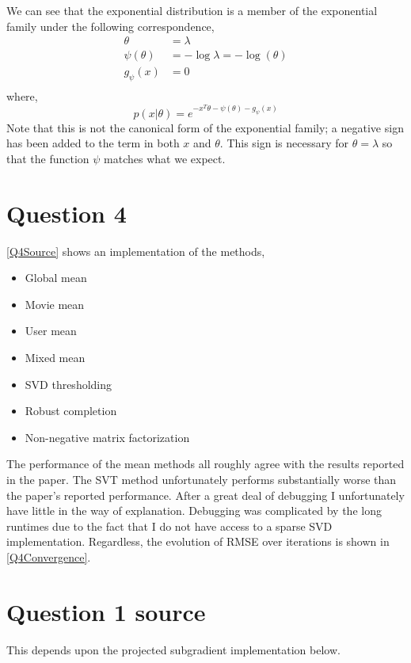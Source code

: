 \documentclass{article}
\begin{document}
\begin{enumerate}
  We can see that the exponential distribution is a member of the
  exponential family under the following correspondence,
  \begin{align*}
    \theta & = \lambda \\
    \psi(\theta) & = -\log \lambda = -\log(\theta) \\
    g_\psi(x) & = 0 \\
  \end{align*}
  where,
  \[ p(x \vert \theta) = e^{-x^T \theta - \psi(\theta) - g_\psi(x)} \]
  Note that this is not the canonical form of the exponential family;
a negative sign has been added to the term in both $x$ and
$\theta$. This sign is necessary for $\theta = \lambda$ so that the
function $\psi$ matches what we expect.
\end{enumerate}

\section{Question 4}

\ref{Q4Source} shows an implementation of the methods,

\begin{itemize}
\item Global mean
\item Movie mean
\item User mean
\item Mixed mean
\item SVD thresholding
\item Robust completion
\item Non-negative matrix factorization
\end{itemize}

The performance of the mean methods all roughly agree with the results
reported in the paper. The SVT method unfortunately performs
substantially worse than the paper's reported performance. After a
great deal of debugging I unfortunately have little in the way of
explanation. Debugging was complicated by the long runtimes due to the
fact that I do not have access to a sparse SVD
implementation. Regardless, the evolution of RMSE over iterations is
shown in \ref{Q4Convergence}.


\appendix

\section{Question 1 source}\label{Q1Source}
This depends upon the projected subgradient implementation below.

\end{document}
